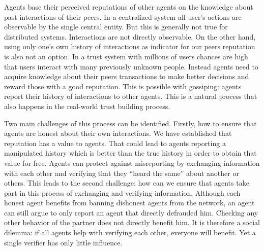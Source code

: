 Agents base their perceived reputations of other agents on the knowledge about past interactions of 
their peers. In a centralized system all user's actions are observable by the single central entity. 
But this is generally not true for distributed systems. Interactions are not directly observable.
On the other hand, using only one's own history of interactions as indicator for our peers reputation
is also not an option. In a trust system with millions of users chances are high that users interact
with many previously unknown people. Instead agents need to acquire knowledge about their peers
transactions to make better decisions and reward those with a good reputation. This is possible with
gossiping: agents report their history of interactions to other agents. This is a natural process 
that also happens in the real-world trust building process. 

Two main challenges of this process can be identified. Firstly, how to ensure that agents are honest
about their own interactions. We have established that reputation has a value to agents. That could
lead to agents reporting a manipulated history which is better than the true history in order to 
obtain that value for free. Agents can protect against misreporting by exchanging information with 
each other and verifying that they ``heard the same'' about another or others. This leads to the 
second challenge: how can we ensure that agents take part in this process of exchanging and verifying
information. Although each honest agent benefits from banning dishonest agents from the network, an
agent can still argue to only report an agent that directly defrauded him. Checking any other 
behavior of the partner does not directly benefit him. It is therefore a social dilemma: if all 
agents help with verifying each other, everyone will benefit. Yet a single verifier has only little 
influence.



